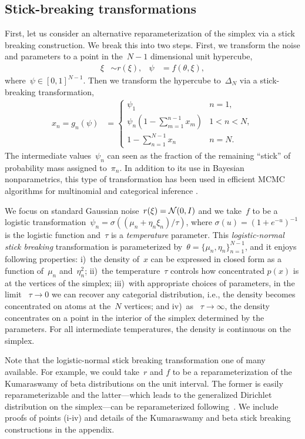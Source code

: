 \subsection{Stick-breaking transformations}
First, let us consider an alternative reparameterization of the simplex
via a stick breaking construction. We break this into two steps. First,
we transform the noise and parameters to a point in the~${N-1}$ dimensional
unit hypercube,
\begin{align}
  \xi &\sim r(\xi), & 
  \psi & = f(\theta, \xi),
\end{align}
where~${\psi \in [0,1]^{N-1}}$. Then we transform the hypercube to~$\Delta_N$
  via a stick-breaking transformation,
\begin{align}
  x_n = g_n(\psi)
  &= \begin{cases}
    \psi_1 & n=1, \\
    \psi_n \left(1- \sum_{m=1}^{n-1} x_m \right) & 1 < n < N, \\
    1- \sum_{n=1}^{N-1} x_n & n=N.
    \end{cases}
\end{align}
The intermediate values~$\psi_n$ can seen as the fraction of the
remaining ``stick'' of probability mass assigned to~${\pi}_n$.  In
addition to its use in Bayesian nonparametrics, this type of
transformation has been used in efficient MCMC algorithms for
multinomial and categorical inference \citep{linderman2015dependent}.

We focus on standard Gaussian noise~${r(\xi) = \mathcal{N}(0,I)}$
and we take~$f$ to be a logistic
transformation~${\psi_n = \sigma((\mu_n + \eta_n \xi_n) / \tau)}$,
where ${\sigma(u) = (1+e^{-u})^{-1}}$ is the logistic function
and~$\tau$ is a \emph{temperature} parameter.  This
\emph{logistic-normal stick breaking} transformation is parameterized
by~${\theta = \{\mu_n, \eta_n\}_{n=1}^{N-1}}$, and it enjoys following
properties: i)~the density of~$x$ can be expressed in closed form as a
function of~$\mu_n$ and~$\eta_n^2$; ii)~the temperature~$\tau$
controls how concentrated $p(x)$ is at the vertices of the simplex;
iii)~with appropriate choices of parameters, in the limit
~$\tau \to 0$ we can recover any categorial distribution, i.e., the
density becomes concentrated on atoms at the~$N$ vertices; and iv)~as
~$\tau \to \infty$, the density concentrates on a point in the
interior of the simplex determined by the parameters. For all
intermediate temperatures, the density is continuous on the simplex.

Note that the logistic-normal stick breaking transformation one of
many available. For example, we could take~$r$ and $f$ to be a
reparameterization of the Kumaraswamy of beta distributions on the
unit interval. The former is easily reparameterizable and the
latter---which leads to the generalized Dirichlet distribution on the
simplex---can be reparameterized following~\citet{naesseth2017reparameterization}. We include proofs of points (i-iv) and details of the Kumaraswamy and beta stick breaking constructions in the appendix.


